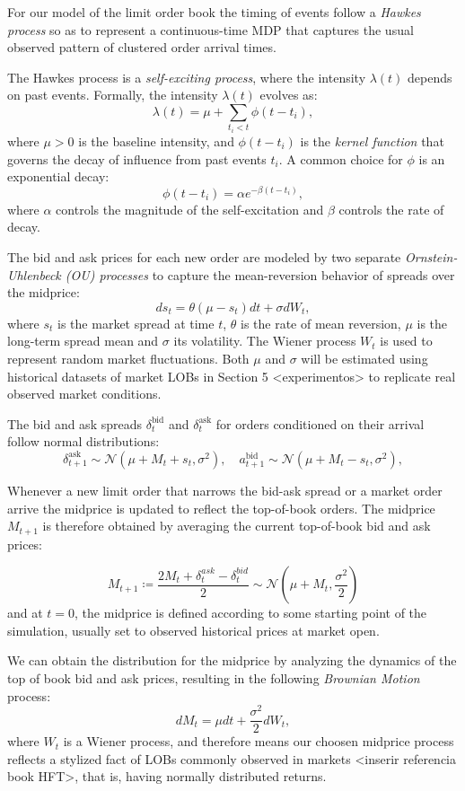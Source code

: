 For our model of the limit order book the timing of events follow a \textit{Hawkes process} so as to represent a continuous-time MDP that captures the usual observed pattern of clustered order arrival times.

The Hawkes process is a \textit{self-exciting process}, where the intensity \( \lambda(t) \) depends on past events. Formally, the intensity \( \lambda(t) \) evolves as:
\[
    \lambda(t) = \mu + \sum_{t_i < t} \phi(t - t_i),
\]
where \( \mu > 0 \) is the baseline intensity, and \( \phi(t - t_i) \) is the \textit{kernel function} that governs the decay of influence from past events \( t_i \). A common choice for \( \phi \) is an exponential decay:
\[
    \phi(t - t_i) = \alpha e^{-\beta (t - t_i)},
\]
where \(\alpha\) controls the magnitude of the self-excitation and \(\beta\) controls the rate of decay.

The bid and ask prices for each new order are modeled by two separate \textit{Ornstein-Uhlenbeck (OU) processes} to capture the mean-reversion behavior of spreads over the midprice:
\[
    ds_t = \theta(\mu - s_t) dt + \sigma dW_t,
\]
where $s_t$ is the market spread at time $t$, $\theta$ is the rate of mean reversion, $\mu$ is the long-term spread mean and $\sigma$ its volatility.
The Wiener process $W_t$ is used to represent random market fluctuations.
Both $\mu$ and $\sigma$ will be estimated using historical datasets of market LOBs in Section 5 <experimentos> to replicate real observed market conditions.

The bid and ask spreads $\delta_t^{\text{bid}}$ and $ \delta_t^{\text{ask}}$ for orders conditioned on their arrival follow normal distributions:
\[
    \delta_{t+1}^{\text{ask}} \sim \mathcal{N}(\mu + M_{t} + s_t, \sigma^2), \quad a_{t+1}^{\text{bid}} \sim \mathcal{N}(\mu + M_{t} - s_t, \sigma^2),
\]

Whenever a new limit order that narrows the bid-ask spread or a market order arrive the midprice is updated to reflect the top-of-book orders. The midprice $M_{t+1}$ is therefore obtained by averaging the current top-of-book bid and ask prices:

\[
    M_{t+1} \coloneqq \frac{2M_t + \delta^{ask}_{t} - \delta^{bid}_{t}}{2}
    \sim \mathcal{N}\left(\mu + M_{t}, \frac{\sigma^2}{2}\right)
\]
and at $t = 0$, the midprice is defined according to some starting point of the simulation, usually set to observed historical prices at market open.

We can obtain the distribution for the midprice by analyzing the dynamics of the top of book bid and ask prices, resulting in the following \textit{Brownian Motion} process:
\[
    dM_t = \mu dt + \frac{\sigma^2}{2} dW_t,
\]
where \( W_t \) is a Wiener process, and therefore means our choosen midprice process reflects a stylized fact of LOBs commonly observed in markets <inserir referencia book HFT>, that is, having normally distributed returns.

